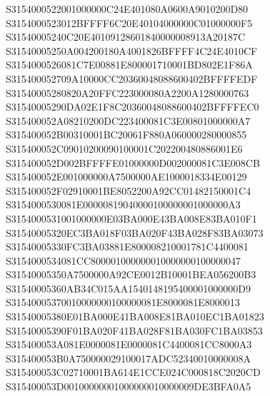 \documentclass[12pt,a4paper]{article}
\begin{document}
\begin{framed}
{S3154000522001000000C24E401080A0600A9010200D80\newline
S3154000523012BFFFF6C20E40104000000C01000000F5\newline
S31540005240C20E40109128601840000008913A20187C\newline
S31540005250A004200180A4001826BFFFF4C24E4010CF\newline
S3154000526081C7E00881E800001710001BD802E1F86A\newline
S315400052709A10000CC20360048088600402BFFFFEDF\newline
S31540005280820A20FFC223000080A2200A1280000763\newline
S31540005290DA02E1F8C20360048088600402BFFFFEC0\newline
S315400052A08210200DC223400081C3E00801000000A7\newline
S315400052B00310001BC20061F880A060000280000855\newline
S315400052C09010200090100001C202200480886001E6\newline
S315400052D002BFFFFE01000000D002000081C3E008CB\newline
S315400052E001000000A7500000AE1000018334E00129\newline
S315400052F02910001BE8052200A92CC01482150001C4\newline
S3154000530081E00000819040000100000001000000A3\newline
S3154000531001000000E03BA000E43BA008E83BA010F1\newline
S31540005320EC3BA018F03BA020F43BA028F83BA03073\newline
S31540005330FC3BA03881E800008210001781C4400081\newline
S3154000534081CC800001000000010000000100000047\newline
S31540005350A7500000A92CE0012B10001BEA056200B3\newline
S31540005360AB34C015AA1540148195400001000000D9\newline
S31540005370010000000100000081E8000081E8000013\newline
S31540005380E01BA000E41BA008E81BA010EC1BA01823\newline
S31540005390F01BA020F41BA028F81BA030FC1BA03853\newline
S315400053A081E0000081E0000081C4400081CC8000A3\newline
S315400053B0A750000029100017ADC52340010000008A\newline
S315400053C02710001BA614E1CCE024C000818C2020CD\newline
S315400053D00100000001000000010000009DE3BFA0A5\newline
}
\end{framed}
\end{document}
